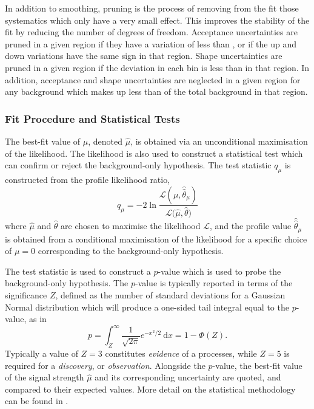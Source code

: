 In addition to smoothing, pruning is the process of removing from the fit those systematics which only have a very small effect.
This improves the stability of the fit by reducing the number of degrees of freedom.
Acceptance uncertainties are pruned in a given region if they have a variation of less than , or if the up and down variations have the same sign in that region.
Shape uncertainties are pruned in a given region if the deviation in each bin is less than  in that region.
In addition, acceptance and shape uncertainties are neglected in a given region for any background which makes up less than  of the total background in that region.


\subsubsection{Fit Procedure and Statistical Tests}

The best-fit value of $\mu$, denoted $\hat\mu$, is obtained via an unconditional maximisation of the likelihood.
The likelihood is also used to construct a statistical test which can confirm or reject the background-only hypothesis.
The test statistic $q_\mu$ is constructed from the profile likelihood ratio,
%
\begin{equation}
  q_\mu = -2 \ln \frac{\mathcal{L(\mu, \hat{\hat{\theta}}_\mu )} } { \mathcal{L(\hat{\mu}, \hat{\theta}}) }
\end{equation}
%
where $\hat{\mu}$ and $\hat{\theta}$ are chosen to maximise the likelihood $\mathcal{L}$, and the profile value $\hat{\hat{\theta}}_\mu$ is obtained from a conditional maximisation of the likelihood for a specific choice of $\mu = 0$ corresponding to the background-only hypothesis.

The test statistic is used to construct a $p$-value which is used to probe the background-only hypothesis.
The $p$-value is typically reported in terms of the significance $Z$, defined as the number of standard deviations for a Gaussian Normal distribution which will produce a one-sided tail integral equal to the $p$-value, as in
%
\begin{equation}
  p = \int_Z^{\infty} \frac{1}{\sqrt{2 \pi}} e^{-x^2/2} ~\mathrm{d} x
  = 1 - \Phi(Z) .
\end{equation}
%
Typically a value of $Z=3$ constitutes \textit{evidence} of a processes, while $Z=5$ is required for a \textit{discovery}, or \textit{observation}.
Alongside the $p$-value, the best-fit value of the signal strength $\hat\mu$ and its corresponding uncertainty are quoted, and compared to their expected values.
More detail on the statistical methodology can be found in .

